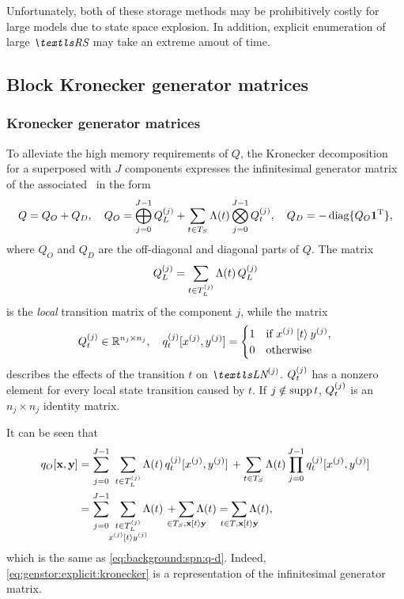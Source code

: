 Unfortunately, both of these storage methods may be prohibitively
costly for large models due to state space explosion. In addition,
explicit enumeration of large $\RS$ may take an extreme amout of
time.

\subsection{Block Kronecker generator matrices}

\subsubsection{Kronecker generator matrices}

To alleviate the high memory requirements of $Q$, the Kronecker
decomposition for a superposed  with $J$ components
expresses the infinitesimal generator matrix of the associated \CTMC\
in the form
\begin{equation}
  \label{eq:genstor:explicit:kronecker}
  Q = Q_O + Q_D, \quad Q_O = \bigoplus_{j = 0}^{J - 1} Q_L^{(j)}
  + \sum_{t \in T_S} \Lambda(t) \bigotimes_{j = 0}^{J - 1}
  Q_{t}^{(j)}, \quad Q_D = -\operatorname{diag} \{ Q_O \bm{\mathrm{1}}^{\mathrm{T}} \} \text,
\end{equation}
where $Q_O$ and $Q_D$ are the off-diagonal and diagonal parts of
$Q$. The matrix
\begin{equation}
  Q_L^{(j)} = \sum_{t \in T_L^{(j)}} \Lambda(t) \, Q_L^{(j)}
\end{equation}
is the \emph{local} transition matrix of the component $j$, while
the matrix
\begin{equation}
  Q_t^{(j)} \in \mathbb{R}^{n_j \times n_j}, \quad
  q_t^{(j)}[x^{(j)},y^{(j)}] = \begin{cases}
    1 & \text{if $x^{(j)} \mathbin{[t\rangle} y^{(j)}$,} \\
    0 & \text{otherwise}
  \end{cases}
\end{equation}
describes the effects of the transition $t$ on
$\LN{j}$. $Q_t^{(j)}$ has a nonzero element for every local state
transition caused by $t$. If $j \notin \operatorname{supp} t$, $Q_t^{(j)}$ is
an $n_j \times n_j$ identity matrix.

It can be seen that
\begin{align}
  q_O[\vec{x}, \vec{y}]
  &= \sum_{\vphantom{\loc{T_L}{j}}j = 0}^{J - 1} \,\, \sum_{t \in
    \loc{T_L}{j}} \Lambda(t) \,
    \loc{q_t}{j}[\loc{x}{j}, \loc{y}{j}] \, + \sum_{t \in T_S} \Lambda(t)
    \prod_{\vphantom{T_S}j = 0}^{J - 1}
    \loc{q_t}{j}[\loc{x}{j}, \loc{y}{j}] \\
  &= \sum_{\vphantom{\loc{T_L}{j}}j = 0}^{J - 1} \,\,
    \sum_{\substack{\vphantom{\loc{T_L}{j}}t \in \loc{T_L}{j} \\
  \mathclap{\loc{x}{j} \tranto{t} \loc{y}{j}}}} \Lambda(t) \, +
  \sum_{\mathclap{\in T_S, \vec{x} \tranto{t} \vec{y}}} \Lambda(t)
  = \sum_{\mathclap{\vphantom{T_S}t \in T, \vec{x} \tranto{t}
  \vec{y}}} \Lambda(t) \text,
  \label{eq:genstor:explicit:block:qblock}
\end{align}
which is the same as \vref{eq:background:spn:q-d}. Indeed,
\cref{eq:genstor:explicit:kronecker} is a representation of the
infinitesimal generator matrix.

